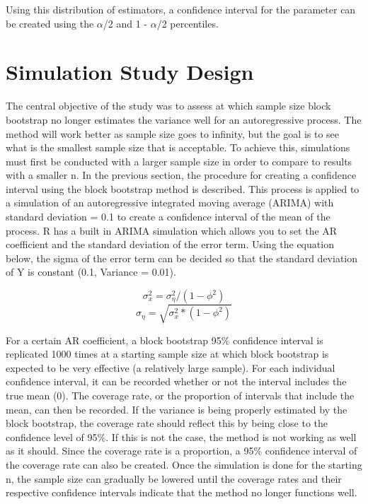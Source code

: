 \documentclass[12pt, letterpaper, titlepage]{article}
\begin{document}
Using this distribution of estimators, a confidence interval for the parameter can be created using the $\alpha$/2 and 1 - $\alpha$/2 percentiles.



\section{Simulation Study Design}
\label{sec:simdesign}

The central objective of the study was to assess at which sample size block bootstrap no longer estimates the variance well for an autoregressive process. The method will work better as sample size goes to infinity, but the goal is to see what is the smallest sample size that is acceptable. To achieve this, simulations must first be conducted with a larger sample size in order to compare to results with a smaller n. In the previous section, the procedure for creating a confidence interval using the block bootstrap method is described. This process is applied to a simulation of an autoregressive integrated moving average (ARIMA) with standard deviation = 0.1 to create a confidence interval of the mean of the process. R has a built in ARIMA simulation which allows you to set the AR coefficient and the standard deviation of the error term. Using the equation below, the sigma of the error term can be decided so that the standard deviation of Y is constant (0.1, Variance = 0.01). 

\[ \sigma_{x}^{2}=\sigma_{\eta}^{2}/\left( 1-\phi^2 \right)\]
\[\sigma_{\eta}=\sqrt{\sigma_{x}^{2}*\left( 1-\phi^2 \right)}\]

For a certain AR coefficient, a block bootstrap 95\% confidence interval is replicated 1000 times at a starting sample size at which block bootstrap is expected to be very effective (a relatively large sample). For each individual confidence interval, it can be recorded whether or not the interval includes the true mean (0). The coverage rate, or the proportion of intervals that include the mean, can then be recorded. If the variance is being properly estimated by the block bootstrap, the coverage rate should reflect this by being close to the confidence level of 95\%. If this is not the case, the method is not working as well as it should. Since the coverage rate is a proportion, a 95\% confidence interval of the coverage rate can also be created. Once the simulation is done for the starting n, the sample size can gradually be lowered until the coverage rates and their respective confidence intervals indicate that the method no longer functions well.
\end{document}
